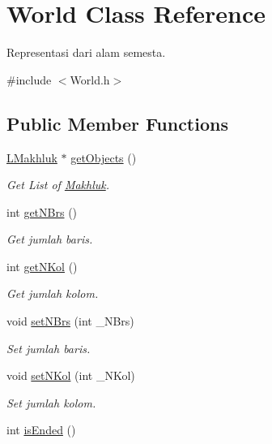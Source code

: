 \hypertarget{class_world}{}\section{World Class Reference}
\label{class_world}


Representasi dari alam semesta.  




{\ttfamily \#include $<$World.\+h$>$}

\subsection*{Public Member Functions}
\begin{DoxyCompactItemize}
\item 
\hyperlink{class_l_makhluk}{L\+Makhluk} $\ast$ \hyperlink{class_world_af9625fa1995e0c3bbdb3e6e7d48effa2}{get\+Objects} ()
\begin{DoxyCompactList}\small\item\em Get List of \hyperlink{class_makhluk}{Makhluk}. \end{DoxyCompactList}\item 
int \hyperlink{class_world_ab77dab54a1e3e7b5657b39f05cb0d2a5}{get\+N\+Brs} ()
\begin{DoxyCompactList}\small\item\em Get jumlah baris. \end{DoxyCompactList}\item 
int \hyperlink{class_world_a2d8ed3b33860324182e773fde59832b2}{get\+N\+Kol} ()
\begin{DoxyCompactList}\small\item\em Get jumlah kolom. \end{DoxyCompactList}\item 
void \hyperlink{class_world_a71dc3d61ccdf8c0a49fb4f719fe16851}{set\+N\+Brs} (int \+\_\+\+N\+Brs)
\begin{DoxyCompactList}\small\item\em Set jumlah baris. \end{DoxyCompactList}\item 
void \hyperlink{class_world_ae0ee86a162756e7075675c58fd1ae363}{set\+N\+Kol} (int \+\_\+\+N\+Kol)
\begin{DoxyCompactList}\small\item\em Set jumlah kolom. \end{DoxyCompactList}\item 
int \hyperlink{class_world_acd627d79b89688184df6e9601ffe1532}{is\+Ended} ()

\end{DoxyCompactItemize}

